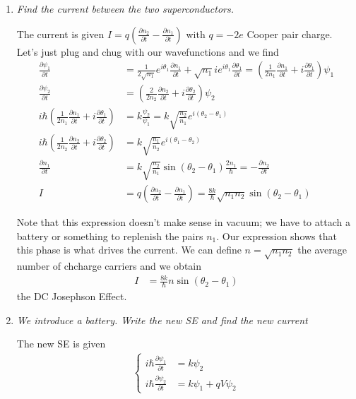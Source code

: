 \documentclass[10pt]{report}
\newcommand{\pd}[2]{\frac{\partial #1}{\partial#2}}
\begin{document}
\begin{enumerate}[1.]
    \item \emph{Find the current between the two superconductors.}
        
        The current is given $I = q\left( \pd{n_2}{t} - \pd{n_1}{t} \right)$ with $q = -2e$ Cooper pair charge. Let's just plug and chug with our wavefunctions and we find
        \begin{align}
            \pd{\psi_1}{t} &= \frac{1}{2\sqrt{n_1}}e^{i\theta_1}\pd{n_1}{t} + \sqrt{n_1}ie^{i\theta_1}\pd{\theta_1}{t} = \left( \frac{1}{2n_1}\pd{n_1}{t} + i\pd{\theta_1}{t} \right)\psi_1\\
            \pd{\psi_2}{t} &= \left( \frac{2}{2n_2}\pd{n_2}{t} + i\pd{\theta_2}{t} \right)\psi_2\\
            i\hbar \left(  \frac{1}{2n_1}\pd{n_1}{t} + i\pd{\theta_1}{t} \right) &= k\frac{\psi_2}{\psi_1} = k\sqrt{\frac{n_2}{n_1}}e^{i(\theta_2 - \theta_1)}\\
            i\hbar \left(  \frac{1}{2n_2}\pd{n_2}{t} + i\pd{\theta_2}{t} \right) &= k\sqrt{\frac{n_1}{n_2}}e^{i(\theta_1 - \theta_2)}\\
            \pd{n_1}{t} &= k\sqrt{\frac{n_2}{n_1}}\sin\left( \theta_2 - \theta_1 \right) \frac{2n_1}{\hbar} = -\pd{n_2}{t}\\
            I &= q\left( \pd{n_2}{t} - \pd{n_1}{t} \right) = \frac{8k}{\hbar} \sqrt{n_1n_2}\sin\left( \theta_2 - \theta_1 \right)
        \end{align}

        Note that this expression doesn't make sense in vacuum; we have to attach a battery or something to replenish the pairs $n_1$. Our expression shows that this phase is what drives the current. We can define $n = \sqrt{n_1n_2}$ the average number of chcharge carriers and we obtain
        \begin{align}
            I &= \frac{8k}{\hbar}n\sin\left( \theta_2 - \theta_1 \right)
        \end{align}
        the DC Josephson Effect. 

    \item \emph{We introduce a battery. Write the new SE and find the new current}

        The new SE is given
        \begin{align}
            \begin{cases}
                i\hbar \pd{\psi_1}{t}\!\!\!\!\! &= k\psi_2\\[5pt]
                i\hbar \pd{\psi_2}{t}\!\!\!\!\! &= k\psi_1 + qV\psi_2
            \end{cases}
        \end{align}


\end{enumerate}
\end{document}
